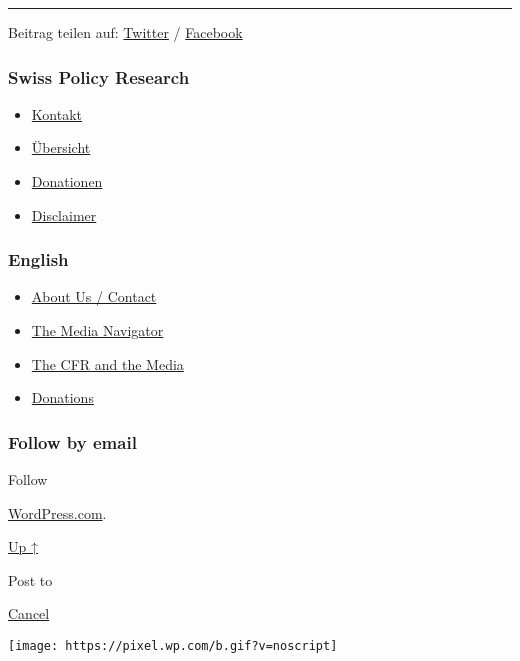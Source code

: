 \begin{center}\rule{0.5\linewidth}{\linethickness}\end{center}

Beitrag teilen auf:
\href{https://twitter.com/intent/tweet?url=https://swprs.org/das-bag-im-corona-fieber/}{Twitter}
/
\href{https://www.facebook.com/share.php?u=https://swprs.org/das-bag-im-corona-fieber/}{Facebook}

\hypertarget{swiss-policy-research}{%
\subsubsection{Swiss Policy Research}\label{swiss-policy-research}}

\begin{itemize}
\tightlist
\item
  \href{https://swprs.org/kontakt/}{Kontakt}
\item
  \href{https://swprs.org/uebersicht/}{Übersicht}
\item
  \href{https://swprs.org/donationen/}{Donationen}
\item
  \href{https://swprs.org/disclaimer/}{Disclaimer}
\end{itemize}

\hypertarget{english}{%
\subsubsection{English}\label{english}}

\begin{itemize}
\tightlist
\item
  \href{https://swprs.org/contact/}{About Us / Contact}
\item
  \href{https://swprs.org/media-navigator/}{The Media Navigator}
\item
  \href{https://swprs.org/the-american-empire-and-its-media/}{The CFR
  and the Media}
\item
  \href{https://swprs.org/donations/}{Donations}
\end{itemize}

\hypertarget{follow-by-email}{%
\subsubsection{Follow by email}\label{follow-by-email}}

Follow

\href{https://wordpress.com/?ref=footer_custom_com}{WordPress.com}.

\protect\hyperlink{}{Up ↑}

Post to

\protect\hyperlink{}{Cancel}

\texttt{[image: https://pixel.wp.com/b.gif?v=noscript]}
